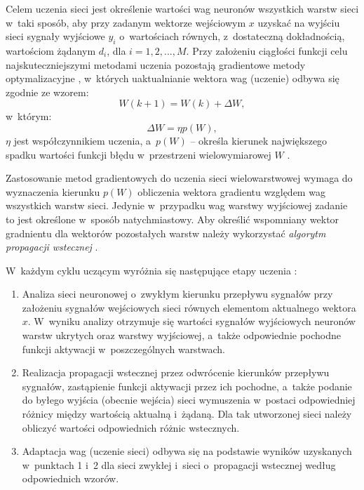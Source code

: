 \documentclass[a4paper, 12pt, oneside]{report}
\begin{document}
Celem uczenia sieci jest określenie wartości wag neuronów wszystkich warstw sieci w~taki sposób, aby przy zadanym wektorze wejściowym $x$ uzyskać na wyjściu sieci sygnały wyjściowe $y_i$ o~wartościach równych, z~dostateczną dokładnością, wartościom żądanym $d_i$, dla $i=1, 2, ..., M$. Przy założeniu ciągłości funkcji celu najskuteczniejszymi metodami uczenia pozostają gradientowe metody optymalizacyjne \cite{Osowski96}, w~których uaktualnianie wektora wag (uczenie) odbywa się zgodnie ze wzorem:
\begin{equation}
W(k+1)=W(k)+\Delta W,
\end{equation}
 w~którym:
\begin{equation}
\Delta W=\eta p(W),
\end{equation}
$\eta$ jest współczynnikiem uczenia, a~$p(W)$ -- określa kierunek największego spadku wartości funkcji błędu w~przestrzeni wielowymiarowej $W$ \cite{Osowski96}.

Zastosowanie metod gradientowych do uczenia sieci wielowarstwowej wymaga do wyznaczenia kierunku $p(W)$ obliczenia wektora gradientu względem wag wszystkich warstw sieci. Jedynie w~przypadku wag warstwy wyjściowej zadanie to jest określone w~sposób natychmiastowy. Aby określić wspomniany wektor gradnientu dla wektorów pozostałych warstw należy wykorzystać \emph{algorytm propagacji wstecznej} \cite{Osowski96}.

 W~każdym cyklu uczącym wyróżnia się następujące etapy uczenia \cite{Osowski96}:
\begin{enumerate}
\item Analiza sieci neuronowej o~zwykłym kierunku przepływu sygnałów przy założeniu sygnałów wejściowych sieci równych elementom aktualnego wektora $x$. W~wyniku analizy otrzymuje się wartości sygnałów wyjściowych neuronów warstw ukrytych oraz warstwy wyjściowej, a~także odpowiednie pochodne funkcji aktywacji w~poszczególnych warstwach.
\item Realizacja propagacji wstecznej przez odwrócenie kierunków przepływu sygnałów, zastąpienie funkcji aktywacji przez ich pochodne, a~także podanie do byłego wyjścia (obecnie wejścia) sieci wymuszenia w~postaci odpowiedniej różnicy między wartością aktualną i~żądaną. Dla tak utworzonej sieci należy obliczyć wartości odpowiednich różnic wstecznych.
\item Adaptacja wag (uczenie sieci) odbywa się na podstawie wyników uzyskanych w~punktach 1 i~2 dla sieci zwykłej i~sieci o~propagacji wstecznej według odpowiednich wzorów.
\end{enumerate}
\end{document}

